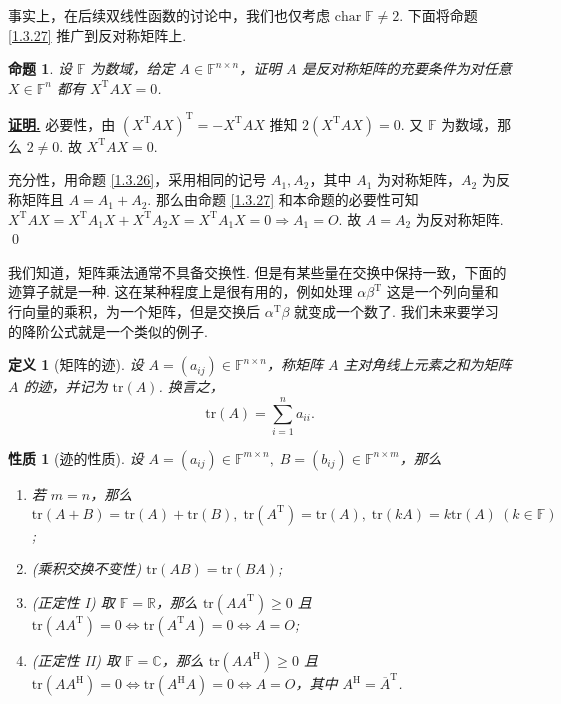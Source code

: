 \documentclass[10pt,openany]{article}
\theoremstyle{thmstyle} %
\theoremstyle{defstyle} %
\newtheorem{definition}[theorem]{定义}
\theoremstyle{prostyle} %
\newtheorem{proposition}[theorem]{命题}
\newtheorem{property}[theorem]{性质}
\theoremstyle{exastyle}
\theoremstyle{remstyle}
\renewenvironment{proof}[1][证明]{\par\underline{\textbf{#1.}} \;\fangsong}{\qed\par}
\newcommand{\T}{^{\text{T}}}
\newcommand{\Her}{^{\text{H}}}
\newcommand{\F}{\mathbb{F}}
\newcommand{\n}{^{n \times n}}
\newcommand{\tz}{\mathrm{char} \;}
\newcommand{\tr}{\mathrm{tr}}
\begin{document}
事实上，在后续双线性函数的讨论中，我们也仅考虑 \( \tz \F \neq 2 \). 下面将命题 \ref{1.3.27} 推广到反对称矩阵上.

\begin{proposition}
	设 \( \F \) 为数域，给定 \( A \in \F\n \)，证明 \( A \) 是反对称矩阵的充要条件为对任意 \( X \in \F^n \) 都有 \( X\T A X= 0 \).
\end{proposition}

\begin{proof}
	必要性，由 \( (X\T AX)\T= -X\T AX \) 推知 \( 2(X\T AX)=0 \). 又 \( \F \) 为数域，那么 \( 2 \neq 0 \). 故 \( X\T AX=0 \).
	
	充分性，用命题 \ref{1.3.26}，采用相同的记号 \( A_1,A_2 \)，其中 \( A_1 \) 为对称矩阵，\( A_2 \) 为反称矩阵且 \( A=A_1+A_2\). 那么由命题 \ref{1.3.27} 和本命题的必要性可知 \( X\T A X=X\T A_1 X+X\T A_2 X= X\T A_1 X=0 \Rightarrow A_1=O \). 故 \( A=A_2 \) 为反对称矩阵.
\end{proof}



我们知道，矩阵乘法通常不具备交换性. 但是有某些量在交换中保持一致，下面的迹算子就是一种. 这在某种程度上是很有用的，例如处理 \( \alpha\beta\T \) 这是一个列向量和行向量的乘积，为一个矩阵，但是交换后 \( \alpha\T\beta \) 就变成一个数了. 我们未来要学习的降阶公式就是一个类似的例子.

\begin{definition}[矩阵的迹]
	设 \( A=(a_{ij}) \in \F\n \)，称矩阵 \( A \) 主对角线上元素之和为矩阵 \( A \) 的迹，并记为 \( \tr(A) \). 换言之，
	\[ \tr(A)=\sum_{i=1}^{n} a_{ii}. \]
\end{definition}

\begin{property}[迹的性质]
	设 \( A=(a_{ij}) \in \F^{m \times n}, \; B=(b_{ij}) \in \F^{n \times m} \)，那么
	\begin{enumerate}[(1)]
		\item 若 \( m=n \)，那么 \( \tr(A+B)=\tr(A)+\tr(B), \; \tr(A\T)=\tr(A), \; \tr(kA)=k\tr(A) \ (k \in \F) \);
		\item (乘积交换不变性) \( \tr(AB)=\tr(BA) \);
		\item (正定性 I) 取 \( \F=\mathbb{R} \)，那么 \( \tr(AA\T) \geq 0 \) 且 \( \tr(AA\T)=0 \Leftrightarrow \tr(A\T A)=0 \Leftrightarrow A=O \);
		\item (正定性 II) 取 \( \F=\mathbb{C} \)，那么  \( \tr(AA\Her) \geq 0 \) 且  \( \tr(AA\Her)=0 \Leftrightarrow \tr(A\Her A)=0 \Leftrightarrow A=O \)，其中 \( A\Her= \overline{A}\T \).
	\end{enumerate}
\end{property}
\end{document}
